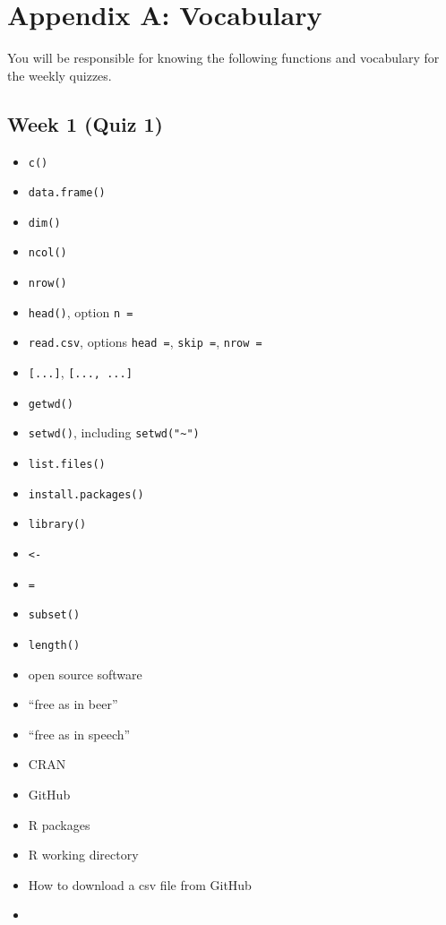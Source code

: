 \documentclass[]{book}
\providecommand{\tightlist}{%
  \setlength{\itemsep}{0pt}\setlength{\parskip}{0pt}}
\theoremstyle{definition}
\theoremstyle{definition}
\theoremstyle{definition}
\theoremstyle{remark}
\begin{document}
\appendix


\chapter{Appendix A: Vocabulary}\label{appendix-a-vocabulary}

You will be responsible for knowing the following functions and
vocabulary for the weekly quizzes.

\section{Week 1 (Quiz 1)}\label{week-1-quiz-1}

\begin{itemize}
\tightlist
\item
  \texttt{c()}
\item
  \texttt{data.frame()}
\item
  \texttt{dim()}
\item
  \texttt{ncol()}
\item
  \texttt{nrow()}
\item
  \texttt{head()}, option \texttt{n\ =}
\item
  \texttt{read.csv}, options \texttt{head\ =}, \texttt{skip\ =},
  \texttt{nrow\ =}
\item
  \texttt{{[}...{]}}, \texttt{{[}...,\ ...{]}}
\item
  \texttt{getwd()}
\item
  \texttt{setwd()}, including \texttt{setwd("\textasciitilde{}")}
\item
  \texttt{list.files()}
\item
  \texttt{install.packages()}
\item
  \texttt{library()}
\item
  \texttt{\textless{}-}
\item
  \texttt{=}
\item
  \texttt{subset()}
\item
  \texttt{length()}
\item
  open source software
\item
  ``free as in beer''
\item
  ``free as in speech''
\item
  CRAN
\item
  GitHub
\item
  R packages
\item
  R working directory
\item
  How to download a csv file from GitHub
\item

\end{itemize}
\end{document}
